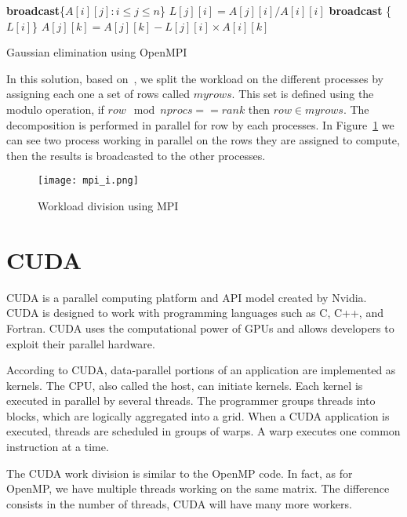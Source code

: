 \begin{algorithm}[H]
\begin{algorithmic}
	\State \textbf{broadcast}\{$A[i][j] : i \leq j \leq n $\}
		\State $L[j][i] = A[j][i] / A[i][i]$ 
	\EndFor
	\State \textbf{broadcast} \{$L[i]$\} 
			\State $A[j][k] = A[j][k] - L[j][i] \times A[i][k]$ 
		\EndFor	
	\EndFor
\EndFor
\end{algorithmic}
\caption{Gaussian elimination using OpenMPI}
\label{alg:mpi_code}
\end{algorithm}

In this solution, based on~\cite{Health2015}, we split the workload on the different processes by assigning each one a set of rows called $myrows$. This set is defined using the modulo operation, if $row \mod nprocs == rank$ then $row \in myrows$. 
The decomposition is performed in parallel for row by each processes. In Figure~\ref{img:mpi_workload} we can see two process working in parallel on the rows they are assigned to compute, then the results is broadcasted to the other processes.


\begin{figure}[H]
\centering
\texttt{[image: mpi\_i.png]}
\caption{Workload division using MPI}
\label{img:mpi_workload}
\end{figure}



\section{CUDA}
CUDA is a parallel computing platform and API model created by Nvidia. CUDA  is designed to work with programming languages such as C, C++, and Fortran.  CUDA uses the computational power of GPUs and allows developers to exploit their parallel hardware. 

According to CUDA, data-parallel portions of an application are implemented as kernels. The CPU, also called the host, can initiate kernels. Each kernel is executed in parallel by several threads. The programmer groups threads into blocks, which are logically aggregated into a grid. When a CUDA application is executed, threads are scheduled in groups of warps. A warp executes one common instruction at a time.

The CUDA work division is similar to the OpenMP code. In fact, as for OpenMP, we have multiple threads working on the same matrix. The difference consists in the number of threads, CUDA will have many more workers.


